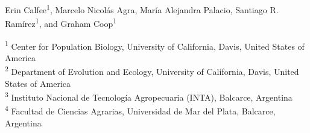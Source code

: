 \bigskip
\begin{flushleft}
	\begin{center}
	Erin Calfee\textsuperscript{1},
	Marcelo Nicolás Agra\textsuperscript{},
	María Alejandra Palacio\textsuperscript{},
	Santiago R. Ramírez\textsuperscript{1}, and
	Graham Coop\textsuperscript{1}
	\end{center}


	\textsuperscript{1} Center for Population Biology, University of California, Davis, United States of America
	\\
	\textsuperscript{2} Department of Evolution and Ecology, University of California, Davis, United States of America
	\\
	\textsuperscript{3} Instituto Nacional de Tecnología Agropecuaria (INTA), Balcarce, Argentina
	\\
	\textsuperscript{4} Facultad de Ciencias Agrarias, Universidad de Mar del Plata, Balcarce, Argentina
	\\
\end{flushleft}

